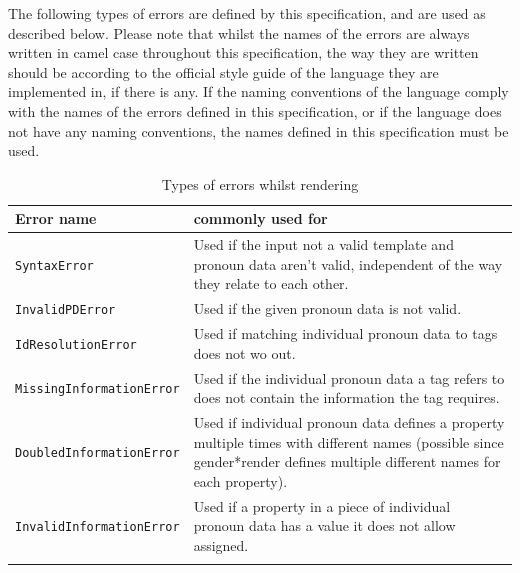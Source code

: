 \documentclass{article}
\newcommand{\GenderRender}{
    gender*render
}
\begin{document}
    The following types of errors are defined by this specification, and are used as described below.
    Please note that whilst the names of the errors are always written in camel case throughout this specification, the way they are written should be according to the official style guide of the language they are implemented in, if there is any.
    If the naming conventions of the language comply with the names of the errors defined in this specification, or if the language does not have any naming conventions, the names defined in this specification must be used.

    \begin{flushleft}
        \begin{center}
            \begin{longtable}{|>{\raggedright\arraybackslash}p{13em} | >{\raggedright\arraybackslash}p{19em} |}
                 \hline
                 Error name & commonly used for \\
                 \hline\hline
                 \texttt{SyntaxError} & Used if the input not a valid template and pronoun data aren't valid, independent of the way they relate to each other. \\
                 \hline
                 \texttt{InvalidPDError} & Used if the given pronoun data is not valid. \\
                 \hline
                 \texttt{IdResolutionError} & Used if matching individual pronoun data to tags does not wo out.\\
                 \hline
                 \texttt{MissingInformationError} & Used if the individual pronoun data a tag refers to does not contain the information the tag requires.\\
                 \hline
                 \texttt{DoubledInformationError} & Used if individual pronoun data defines a property multiple times with different names (possible since \GenderRender defines multiple different names for each property). \\
                 \hline
                 \texttt{InvalidInformationError} & Used if a property in a piece of individual pronoun data has a value it does not allow assigned. \\
                 \hline
                \caption{Types of errors whilst rendering}
            \end{longtable}
        \end{center}
    \end{flushleft}
\end{document}
